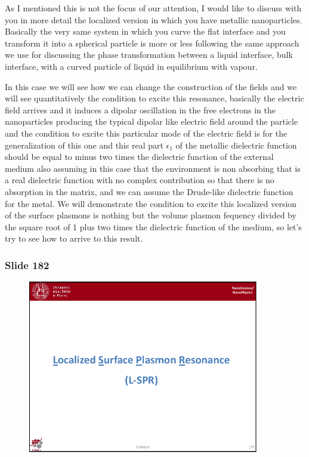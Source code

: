 \documentclass[../main/main.tex]{subfiles}
\begin{document}
As I mentioned this is not the focus of our attention, I would like to discuss with you in more detail the localized version in which you have metallic nanoparticles. Basically the very same system in which you curve the flat interface and you transform it into a spherical particle is more or less following the same approach we use for discussing the phase transformation between a liquid interface, bulk interface, with a curved particle of liquid in equilibrium with vapour. 

In this case we will see how we can change the construction of the fields and we will see quantitatively the condition to excite this resonance, basically the electric field arrives and it induces a dipolar oscillation in the free electrons in the nanoparticles producing the typical dipolar like electric field around the particle and the condition to excite this particular mode of the electric field is for the generalization of this one and this real part $\epsilon_1$ of the metallic dielectric function should be equal to minus two times the dielectric function of the external medium also assuming in this case that the environment is non absorbing that is a real dielectric function with no complex contribution so that there is no absorption in the matrix, and we can assume the Drude-like dielectric function for the metal. We will demonstrate the condition to excite this localized version of the surface plasmons is nothing but the volume plasmon fequency divided by the square root of 1 plus two times the dielectric function of the medium, so let's try to see how to arrive to this result.

\newpage

\subsubsection{Slide 182}

\begin{figure}[h!]
\centering
\includegraphics[page=4,width=0.9\textwidth]{../lessons/pdf_file/11_lesson.pdf}
\end{figure}
\end{document}
